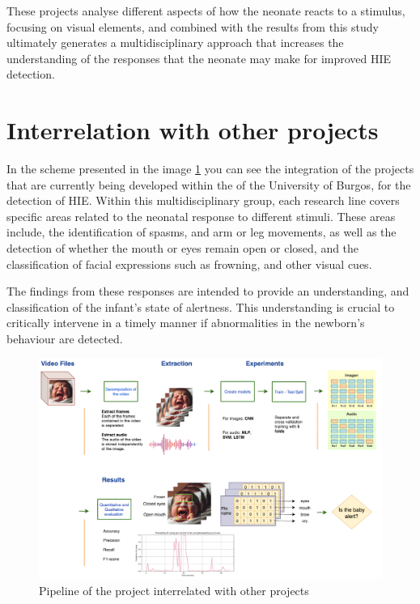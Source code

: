 These projects analyse different aspects of how the neonate reacts to a stimulus, focusing on visual elements, and combined with the results from this study ultimately generates a multidisciplinary approach that increases the understanding of the responses that the neonate may make for improved HIE detection.

\section{Interrelation with other projects}
In the scheme presented in the image \ref{fig:general-project} you can see the integration of the projects that are currently being developed within the  of the University of Burgos, for the detection of HIE. Within this multidisciplinary group, each research line covers specific areas related to the neonatal response to different stimuli. These areas include, the identification of spasms, and arm or leg movements, as well as the detection of whether the mouth or eyes remain open or closed, and the classification of facial expressions such as frowning, and other visual cues. 

The findings from these responses are intended to provide an understanding, and classification of the infant's state of alertness. This understanding is crucial to critically intervene in a timely manner if abnormalities in the newborn's behaviour are detected.
\newline
\begin{figure}[h]
\centering
    \includegraphics[width=1\textwidth]{figures/General-project.png}
\caption{Pipeline of the project interrelated with other projects}
\label{fig:general-project}
\end{figure}

